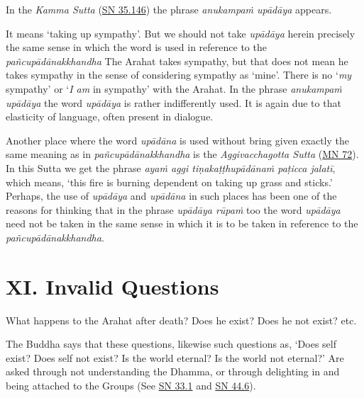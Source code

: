 In the \textit{Kamma Sutta} (\href{https://suttacentral.net/sn35.146/en/bodhi}{SN 35.146}) the phrase \textit{anukampaṁ upādāya} appears.

It means `taking up sympathy'. But we should not take \textit{upādāya} herein precisely the same sense in which the word is used in reference to the \textit{pañcupādānakkhandha} The Arahat takes sympathy, but that does not mean he takes sympathy in the sense of considering sympathy as `mine'. There is no `\emph{my} sympathy' or `\emph{I am} in sympathy' with the Arahat. In the phrase \textit{anukampaṁ upādāya} the word \textit{upādāya} is rather indifferently used. It is again due to that elasticity of language, often present in dialogue.

Another place where the word \textit{upādāna} is used without bring given exactly the same meaning as in \textit{pañcupādānakkhandha} is the \textit{Aggivacchagotta Sutta} (\href{https://suttacentral.net/mn72/en/thanissaro}{MN 72}). In this Sutta we get the phrase \textit{ayaṁ aggi tiṇakaṭṭhupādānaṁ paṭicca jalatī}, which means, `this fire is burning dependent on taking up grass and sticks.' Perhaps, the use of \textit{upādāya} and \textit{upādāna} in such places has been one of the reasons for thinking that in the phrase \textit{upādāya rūpaṁ} too the word \textit{upādāya} need not be taken in the same sense in which it is to be taken in reference to the \textit{pañcupādānakkhandha}.

\hypertarget{_xi_invalid_questions}{%
\section{XI. Invalid Questions}\label{_xi_invalid_questions}}

What happens to the Arahat after death? Does he exist? Does he not exist? etc.

The Buddha says that these questions, likewise such questions as, `Does self exist? Does self not exist? Is the world eternal? Is the world not eternal?' Are asked through not understanding the Dhamma, or through delighting in and being attached to the Groups (See \href{https://suttacentral.net/sn33.1/en/sujato}{SN 33.1} and \href{https://suttacentral.net/sn44.6/en/bodhi}{SN 44.6}).

